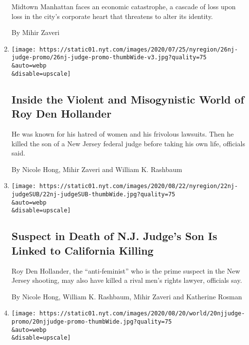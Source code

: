 \begin{enumerate}
  Midtown Manhattan faces an economic catastrophe, a cascade of loss
  upon loss in the city's corporate heart that threatens to alter its
  identity.~

  By Mihir Zaveri
\item
  \href{/2020/07/26/nyregion/roy-den-hollander-judge.html}{}

  \texttt{[image: https://static01.nyt.com/images/2020/07/25/nyregion/26nj-judge-promo/26nj-judge-promo-thumbWide-v3.jpg?quality=75\\\&auto=webp\\\&disable=upscale]}

  \hypertarget{inside-the-violent-and-misogynistic-world-of-roy-den-hollander}{%
  \subsection{Inside the Violent and Misogynistic World of Roy Den
  Hollander}\label{inside-the-violent-and-misogynistic-world-of-roy-den-hollander}}

  He was known for his hatred of women and his frivolous lawsuits. Then
  he killed the son of a New Jersey federal judge before taking his own
  life, officials said.

  By Nicole Hong, Mihir Zaveri and William K. Rashbaum
\item
  \href{/2020/07/22/nyregion/roy-den-hollander-esther-salas.html}{}

  \texttt{[image: https://static01.nyt.com/images/2020/08/22/nyregion/22nj-judgeSUB/22nj-judgeSUB-thumbWide.jpg?quality=75\\\&auto=webp\\\&disable=upscale]}

  \hypertarget{suspect-in-death-of-nj-judges-son-is-linked-to-california-killing}{%
  \subsection{Suspect in Death of N.J. Judge's Son Is Linked to
  California
  Killing}\label{suspect-in-death-of-nj-judges-son-is-linked-to-california-killing}}

  Roy Den Hollander, the ``anti-feminist'' who is the prime suspect in
  the New Jersey shooting, may also have killed a rival men's rights
  lawyer, officials say.

  By Nicole Hong, William K. Rashbaum, Mihir Zaveri and Katherine Rosman
\item
  \href{/2020/07/20/nyregion/esther-salas.html}{}

  \texttt{[image: https://static01.nyt.com/images/2020/08/20/world/20njjudge-promo/20njjudge-promo-thumbWide.jpg?quality=75\\\&auto=webp\\\&disable=upscale]}


\end{enumerate}

